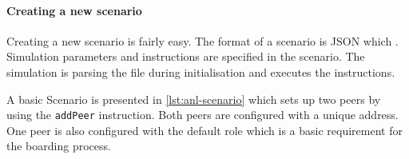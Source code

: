 \paragraph{Creating a new scenario}
Creating a new scenario is fairly easy. The format of a scenario is JSON which \cite{wiki:json}.
Simulation parameters and instructions are specified in the scenario. The simulation is parsing the file during initialisation and executes the instructions.

A basic Scenario is presented in \vref{lst:anl-scenario} which sets up two peers by using the \lstinline|addPeer| instruction. Both peers are configured with a unique address. One peer is also configured with the default role \signal which is a basic requirement for the boarding process. 
